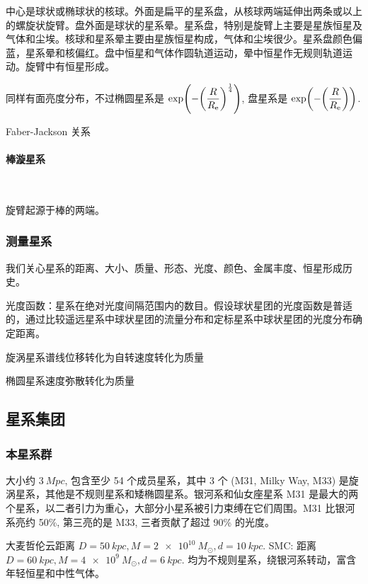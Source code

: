 \documentclass[../天体物理基础.tex]{subfiles}
\begin{document}
中心是球状或椭球状的核球。外面是扁平的星系盘，从核球两端延伸出两条或以上的螺旋状旋臂。盘外面是球状的星系晕。星系盘，特别是旋臂上主要是星族\uppercase\expandafter{}恒星及气体和尘埃。核球和星系晕主要由星族\uppercase\expandafter{}恒星构成，气体和尘埃很少。星系盘颜色偏蓝，星系晕和核偏红。盘中恒星和气体作圆轨道运动，晕中恒星作无规则轨道运动。旋臂中有恒星形成。

同样有面亮度分布，不过椭圆星系是 $\exp\mleft(-\mleft(\dfrac{R}{R_{\mathrm{e}}}\mright)^{\frac{1}{4}}\mright)$, 盘星系是 $\exp\mleft(-\mleft(\dfrac{R}{R_{\mathrm{e}}}\mright)\mright)$.

Faber-Jackson 关系

\paragraph{棒漩星系}~{}

旋臂起源于棒的两端。

\subsubsection{测量星系}
我们关心星系的距离、大小、质量、形态、光度、颜色、金属丰度、恒星形成历史。

光度函数：星系在绝对光度间隔范围内的数目。假设球状星团的光度函数是普适的，通过比较遥远星系中球状星团的流量分布和定标星系中球状星团的光度分布确定距离。

旋涡星系谱线位移转化为自转速度转化为质量

椭圆星系速度弥散转化为质量

\subsection{星系集团}

\subsubsection{本星系群}

大小约 $\qty{3}{Mpc}$, 包含至少 54 个成员星系，其中 3 个 (M31, Milky Way, M33) 是旋涡星系，其他是不规则星系和矮椭圆星系。银河系和仙女座星系 M31 是最大的两个星系，以二者引力为重心，大部分小星系被引力束缚在它们周围。M31 比银河系亮约 50\%, 第三亮的是 M33, 三者贡献了超过 90\% 的光度。

大麦哲伦云距离 $D=\qty{50}{kpc}, M=\qty{2e10}{M_{\odot}}, d=\qty{10}{kpc}$. SMC: 距离 $D=\qty{60}{kpc}, M=\qty{4e9}{M_{\odot}}, d=\qty{6}{kpc}$. 均为不规则星系，绕银河系转动，富含年轻恒星和中性气体。
\end{document}
